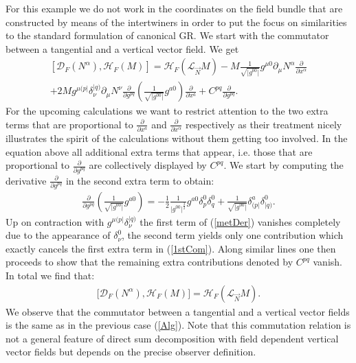 \documentclass[a4paper,12pt, DIV=14, BCOR=5mm, twoside, headsepline]{scrbook}
\begin{document}
For this example we do not work in the coordinates on the field bundle that are constructed by means of the intertwiners in order to put the focus on similarities to the standard formulation of canonical GR. We start with the commutator between a  tangential and a vertical vector field.
%
%
%
We get 
\begin{multline}\label{1stCom}
    \left[ \mathcal{D}_F(N^{\alpha}) , \mathcal{H}_F(M) \right] = \mathcal{H}_F(\mathcal{L}_{\vec{N}}M) - M \frac{1}{\sqrt{\vert g^{00} \vert }} g^{\mu0} \partial_{\mu} N^{\alpha} \frac{\partial}{\partial x^{\alpha}} \\
    +2M g^{\mu (p\vert} \delta^{\vert q)}_{\nu} \partial_{\mu} N^{\nu} \frac{\partial}{\partial g ^{pq}} \left(\frac{1}{\sqrt{\vert g^{00} \vert }} g^{a0} \right) \frac{\partial}{\partial x^a} + C^{pq} \frac{\partial}{\partial g^{pq}}.
\end{multline}
For the upcoming calculations we want to restrict attention to the two extra terms that are proportional to $\frac{\partial}{\partial x^a}$ and $\frac{\partial}{\partial x^{\alpha}}$ respectively as their treatment nicely illustrates the spirit of the calculations without them getting too involved. In the equation above all additional extra terms that appear, i.e. those that are proportional to $\frac{\partial}{\partial g^{pq}}$ are collectively displayed by $C^{pq}$. We start by computing the derivative $\frac{\partial}{\partial g^{pq}}$ in the second extra term to obtain:
\begin{align}\label{metDer}
    \frac{\partial}{\partial g ^{pq}} \left (\frac{1}{\sqrt{\vert g^{00} \vert }} g^{a0} \right) = -\frac{1}{2} \frac{1}{\vert g^{00} \vert^{\frac{3}{2}}} g^{a0} \delta^0_p \delta^0_q +  \frac{1}{\sqrt{\vert g^{00} \vert }} \delta^a_{(p \vert} \delta^0 _{\vert q)}. 
\end{align}
Up on contraction with $g^{\mu ( p \vert} \delta ^{\vert q)}_{\nu}$ the first term of (\ref{metDer}) vanishes completely due to the appearance of $\delta^0_{\nu}$, the second term yields only one contribution which exactly cancels the first extra term in (\ref{1stCom}). Along similar lines one then proceeds to show that the remaining extra contributions denoted by $C^{pq}$ vanish. In total we find that:
\begin{align}\label{FDH}
    \bigl[ \mathcal{D}_F(N^{\alpha}) , \mathcal{H}_F(M) \bigr] = \mathcal{H}_F(\mathcal{L}_{\vec{N}}M).
\end{align}
We observe that the commutator between a tangential and a vertical vector fields is the same as in the previous case (\ref{Alg}).
Note that this commutation relation is not a general feature of direct sum decomposition with field dependent vertical vector fields but depends on the precise observer definition. 
\end{document}
